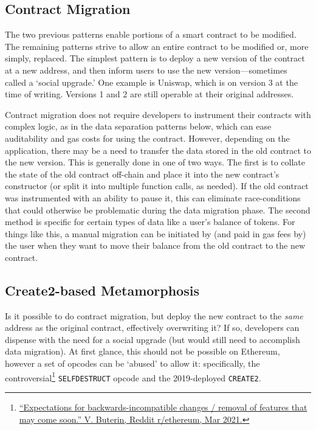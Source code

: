 
\subsection{Contract Migration}
\label{sec:migration}

The two previous patterns enable portions of a smart contract to be modified. The remaining patterns strive to allow an entire contract to be modified or, more simply, replaced. The simplest pattern is to deploy a new version of the contract at a new address, and then inform users to use the new version---sometimes called a `social upgrade.' One example is Uniswap, which is on version 3 at the time of writing. Versions 1 and 2 are still operable at their original addresses. 

Contract migration does not require developers to instrument their contracts with complex logic, as in the data separation patterns below, which can ease auditability and gas costs for using the contract. However, depending on the application, there may be a need to transfer the data stored in the old contract to the new version. This is generally done in one of two ways. The first is to collate the state of the old contract off-chain and place it into the new contract's constructor (or split it into multiple function calls, as needed). If the old contract was instrumented with an ability to pause it, this can eliminate race-conditions that could otherwise be problematic during the data migration phase. The second method is specific for certain types of data like a user's balance of tokens. For things like this, a manual migration can be initiated by (and paid in gas fees by) the user when they want to move their balance from the old contract to the new contract.  
 


\subsection{Create2-based Metamorphosis}
\label{sec:metamorphic}

Is it possible to do contract migration, but deploy the new contract to the \textit{same} address as the original contract, effectively overwriting it? If so, developers can dispense with the need for a social upgrade (but would still need to accomplish data migration). At first glance, this should not be possible on Ethereum, however a set of opcodes can be `abused' to allow it: specifically, the controversial\footnote{\href{https://www.reddit.com/r/ethereum/comments/lx32kv/expectations\_for\_backwardsincompatible\_changes/}{``Expectations for backwards-incompatible changes / removal of features that may come soon.'' V. Buterin, Reddit r/ethereum, Mar 2021.}} \texttt{SELFDESTRUCT} opcode and the 2019-deployed \texttt{CREATE2}. 

